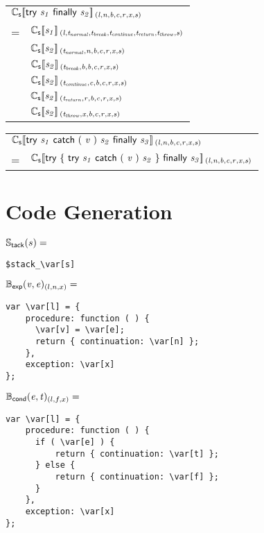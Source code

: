 \documentclass[a4j]{jsarticle}
\newcommand{\lb}{[\![}				%
\newcommand{\rb}{]\!]}				%
\newcommand{\db}[1]{\lb#1\rb}			%
\newcommand{\den}[2]{{#1}\db{#2}\,}
\newcommand{\defC}[3]{\den{#1}{\sf #2}_{\it #3}}
\newcommand{\Cs}{\defC{\mathbb{C}_{\sf s}}}
\newcommand{\Stack}[1]{\mathbb{S}_{\sf tack}(#1)}
\newcommand{\defB}[3]{{#1}({\sf #2})_{#3}}
\newcommand{\Bexp}{\defB{\mathbb{B}_{\sf exp}}}
\newcommand{\Bcond}{\defB{\mathbb{B}_{\sf cond}}}
\newcommand{\var}[1]{{\it #1}}
\begin{document}
\vspace{1em}

\begin{tabular}{ll}
\multicolumn{2}{l}{
	$ \Cs{ try\ \var{s_1}\ finally\ \var{s_2} }{(l, n, b, c, r, x, s)} $
}  \\
=  &  $ \Cs{ \var{s_1} }{(l, t_{normal}, t_{break}, t_{continue}, t_{return}, t_{throw}, s)} $ \\
   &  $ \Cs{ \var{s_2} }{(t_{normal}  , n, b, c, r, x, s)} $  \\
   &  $ \Cs{ \var{s_2} }{(t_{break}   , b, b, c, r, x, s)} $  \\
   &  $ \Cs{ \var{s_2} }{(t_{continue}, c, b, c, r, x, s)} $  \\
   &  $ \Cs{ \var{s_2} }{(t_{return}  , r, b, c, r, x, s)} $  \\
   &  $ \Cs{ \var{s_2} }{(t_{throw}   , x, b, c, r, x, s)} $
\end{tabular}

\vspace{1em}

\begin{tabular}{ll}
\multicolumn{2}{l}{
	$ \Cs{ try\ \var{s_1}\ catch\ (\ \var{v}\ )\ \var{s_2}\ finally\ \var{s_3} }{(l, n, b, c, r, x, s)} $
}  \\
=  &  $ \Cs{ try\ \{\ try\ \var{s_1}\ catch\ (\ \var{v}\ )\ \var{s_2}\ \}\ finally\ \var{s_3} }{(l, n, b, c, r, x, s)} $ \\
\end{tabular}




\section{Code Generation}

$  \Stack{ s }  =  $
\begin{Verbatim}[frame=single, commandchars=\\\[\]]
$stack_\var[s]
\end{Verbatim}


$  \Bexp{ \var{v}, \var{e} }{(l, n, x)}  =  $
\begin{Verbatim}[frame=single, commandchars=\\\[\]]
var \var[l] = {
    procedure: function ( ) {
      \var[v] = \var[e];
      return { continuation: \var[n] };
    },
    exception: \var[x]
};
\end{Verbatim}


$  \Bcond{ \var{e}, \var{t} }{(l, f, x)}  =  $
\begin{Verbatim}[frame=single, commandchars=\\\[\]]
var \var[l] = {
    procedure: function ( ) {
      if ( \var[e] ) {
          return { continuation: \var[t] };
      } else {
          return { continuation: \var[f] };
      }
    },
    exception: \var[x]
};
\end{Verbatim}
\end{document}
